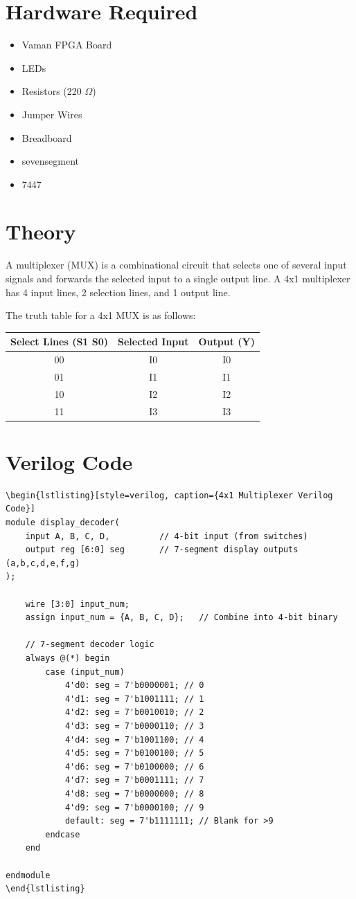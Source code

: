 \documentclass[a4paper,12pt]{article}
\begin{document}
\section*{Hardware Required}
\begin{itemize}
    \item Vaman FPGA Board
    \item LEDs
    \item Resistors (220 $\Omega$)
    \item Jumper Wires
    \item Breadboard
    \item sevensegment
    \item 7447
\end{itemize}

\section*{Theory}
A multiplexer (MUX) is a combinational circuit that selects one of several input signals and forwards the selected input to a single output line.  
A 4x1 multiplexer has 4 input lines, 2 selection lines, and 1 output line.

The truth table for a 4x1 MUX is as follows:

\begin{center}
\begin{tabular}{|c|c|c|}
\hline
Select Lines (S1 S0) & Selected Input & Output (Y) \\
\hline
00 & I0 & I0 \\
01 & I1 & I1 \\
10 & I2 & I2 \\
11 & I3 & I3 \\
\hline
\end{tabular}
\end{center}

\section*{Verilog Code}
\begin{verbatim}
\begin{lstlisting}[style=verilog, caption={4x1 Multiplexer Verilog Code}]
module display_decoder(
    input A, B, C, D,          // 4-bit input (from switches)
    output reg [6:0] seg       // 7-segment display outputs (a,b,c,d,e,f,g)
);

    wire [3:0] input_num;
    assign input_num = {A, B, C, D};   // Combine into 4-bit binary

    // 7-segment decoder logic
    always @(*) begin
        case (input_num)
            4'd0: seg = 7'b0000001; // 0
            4'd1: seg = 7'b1001111; // 1
            4'd2: seg = 7'b0010010; // 2
            4'd3: seg = 7'b0000110; // 3
            4'd4: seg = 7'b1001100; // 4
            4'd5: seg = 7'b0100100; // 5
            4'd6: seg = 7'b0100000; // 6
            4'd7: seg = 7'b0001111; // 7
            4'd8: seg = 7'b0000000; // 8
            4'd9: seg = 7'b0000100; // 9
            default: seg = 7'b1111111; // Blank for >9
        endcase
    end

endmodule
\end{lstlisting}
\end{verbatim}
\end{document}

